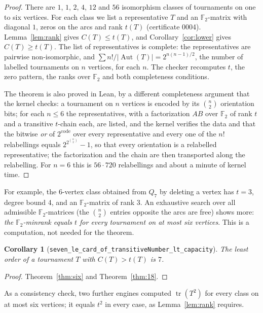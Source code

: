 \documentclass[11pt]{article}
\newtheorem{corollary}[theorem]{Corollary}
\theoremstyle{definition}
\theoremstyle{remark}
\newcommand{\F}{\mathbb{F}}
\newcommand{\tr}{\operatorname{tr}}
\newcommand{\Aut}{\operatorname{Aut}}
\begin{document}
\begin{proof}
There are $1$, $1$, $2$, $4$, $12$ and $56$ isomorphism classes of tournaments on one to six vertices. For
each class we list a representative $T$ and an $\F_2$-matrix with diagonal $1$, zeros on the arcs
and rank $t(T)$ (certificate 0004). Lemma~\ref{lem:rank} gives $C(T) \le t(T)$, and
Corollary~\ref{cor:lower} gives $C(T) \ge t(T)$. The list of representatives is complete: the
representatives are pairwise non-isomorphic, and $\sum n!/|\Aut(T)| = 2^{n(n-1)/2}$, the number of
labelled tournaments on $n$ vertices, for each $n$. The checker recomputes $t$, the zero pattern, the
ranks over $\F_2$ and both completeness conditions.

The theorem is also proved in Lean, by a different completeness argument that the kernel checks: a
tournament on $n$ vertices is encoded by its $\binom n2$ orientation bits; for each $n \le 6$ the
representatives, with a factorization $AB$ over $\F_2$ of rank $t$ and a transitive $t$-chain each, are
listed, and the kernel verifies the data and that the bitwise \emph{or} of $2^{\mathrm{code}}$ over every
representative and every one of the $n!$ relabellings equals $2^{2^{\binom n2}} - 1$, so that every
orientation is a relabelled representative; the factorization and the chain are then transported along
the relabelling. For $n = 6$ this is $56 \cdot 720$ relabellings and about a minute of kernel time.
\end{proof}

For example, the 6-vertex class obtained from $Q_7$ by deleting a vertex has $t = 3$, degree bound
4, and an $\F_2$-matrix of rank 3. An exhaustive search over all admissible $\F_2$-matrices (the
$\binom n2$ entries opposite the arcs are free) shows more: \emph{the $\F_2$-minrank equals $t$ for
every tournament on at most six vertices}. This is a computation, not needed for the theorem.

\begin{corollary}[\texttt{seven\_le\_card\_of\_transitiveNumber\_lt\_capacity}]
The least order of a tournament $T$ with $C(T) > t(T)$ is $7$.
\end{corollary}

\begin{proof}
Theorem~\ref{thm:six} and Theorem~\ref{thm:18}.
\end{proof}

As a consistency check, two further engines computed $\tr(T^2)$ for every class on at most six
vertices; it equals $t^2$ in every case, as Lemma~\ref{lem:rank} requires.
\end{document}
